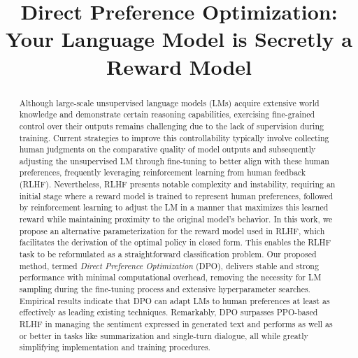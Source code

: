 \title{Direct Preference Optimization: Your Language Model is Secretly a Reward Model}

\begin{abstract}
Although large-scale unsupervised language models (LMs) acquire extensive world knowledge and demonstrate certain reasoning capabilities, exercising fine-grained control over their outputs remains challenging due to the lack of supervision during training. Current strategies to improve this controllability typically involve collecting human judgments on the comparative quality of model outputs and subsequently adjusting the unsupervised LM through fine-tuning to better align with these human preferences, frequently leveraging reinforcement learning from human feedback (RLHF). Nevertheless, RLHF presents notable complexity and instability, requiring an initial stage where a reward model is trained to represent human preferences, followed by reinforcement learning to adjust the LM in a manner that maximizes this learned reward while maintaining proximity to the original model's behavior. In this work, we propose an alternative parameterization for the reward model used in RLHF, which facilitates the derivation of the optimal policy in closed form. This enables the RLHF task to be reformulated as a straightforward classification problem. Our proposed method, termed \textit{Direct Preference Optimization} (DPO), delivers stable and strong performance with minimal computational overhead, removing the necessity for LM sampling during the fine-tuning process and extensive hyperparameter searches. Empirical results indicate that DPO can adapt LMs to human preferences at least as effectively as leading existing techniques. Remarkably, DPO surpasses PPO-based RLHF in managing the sentiment expressed in generated text and performs as well as or better in tasks like summarization and single-turn dialogue, all while greatly simplifying implementation and training procedures.
\end{abstract}

